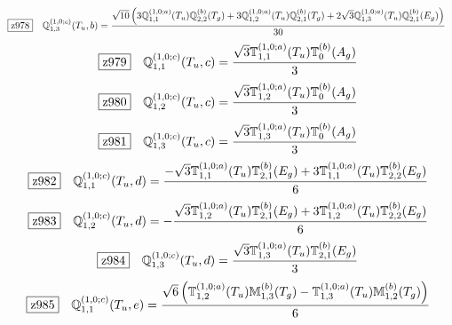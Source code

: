 \documentclass[fleqn,10pt,landscape]{jsarticle}
\begin{document}
\begin{dmath*}
\hspace*{3mm}\fbox{z978}\quad \mathbb{Q}_{1,3}^{(1,0;c)}(T_{u},b)=\frac{\sqrt{10} \left(3 \mathbb{Q}_{1,1}^{(1,0;a)}(T_{u}) \mathbb{Q}_{2,2}^{(b)}(T_{g}) + 3 \mathbb{Q}_{1,2}^{(1,0;a)}(T_{u}) \mathbb{Q}_{2,1}^{(b)}(T_{g}) + 2 \sqrt{3} \mathbb{Q}_{1,3}^{(1,0;a)}(T_{u}) \mathbb{Q}_{2,1}^{(b)}(E_{g})\right)}{30}
\end{dmath*}
\begin{dmath*}
\hspace*{3mm}\fbox{z979}\quad \mathbb{Q}_{1,1}^{(1,0;c)}(T_{u},c)=\frac{\sqrt{3} \mathbb{T}_{1,1}^{(1,0;a)}(T_{u}) \mathbb{T}_{0}^{(b)}(A_{g})}{3}
\end{dmath*}
\begin{dmath*}
\hspace*{3mm}\fbox{z980}\quad \mathbb{Q}_{1,2}^{(1,0;c)}(T_{u},c)=\frac{\sqrt{3} \mathbb{T}_{1,2}^{(1,0;a)}(T_{u}) \mathbb{T}_{0}^{(b)}(A_{g})}{3}
\end{dmath*}
\begin{dmath*}
\hspace*{3mm}\fbox{z981}\quad \mathbb{Q}_{1,3}^{(1,0;c)}(T_{u},c)=\frac{\sqrt{3} \mathbb{T}_{1,3}^{(1,0;a)}(T_{u}) \mathbb{T}_{0}^{(b)}(A_{g})}{3}
\end{dmath*}
\begin{dmath*}
\hspace*{3mm}\fbox{z982}\quad \mathbb{Q}_{1,1}^{(1,0;c)}(T_{u},d)=\frac{- \sqrt{3} \mathbb{T}_{1,1}^{(1,0;a)}(T_{u}) \mathbb{T}_{2,1}^{(b)}(E_{g}) + 3 \mathbb{T}_{1,1}^{(1,0;a)}(T_{u}) \mathbb{T}_{2,2}^{(b)}(E_{g})}{6}
\end{dmath*}
\begin{dmath*}
\hspace*{3mm}\fbox{z983}\quad \mathbb{Q}_{1,2}^{(1,0;c)}(T_{u},d)=- \frac{\sqrt{3} \mathbb{T}_{1,2}^{(1,0;a)}(T_{u}) \mathbb{T}_{2,1}^{(b)}(E_{g}) + 3 \mathbb{T}_{1,2}^{(1,0;a)}(T_{u}) \mathbb{T}_{2,2}^{(b)}(E_{g})}{6}
\end{dmath*}
\begin{dmath*}
\hspace*{3mm}\fbox{z984}\quad \mathbb{Q}_{1,3}^{(1,0;c)}(T_{u},d)=\frac{\sqrt{3} \mathbb{T}_{1,3}^{(1,0;a)}(T_{u}) \mathbb{T}_{2,1}^{(b)}(E_{g})}{3}
\end{dmath*}
\begin{dmath*}
\hspace*{3mm}\fbox{z985}\quad \mathbb{Q}_{1,1}^{(1,0;c)}(T_{u},e)=\frac{\sqrt{6} \left(\mathbb{T}_{1,2}^{(1,0;a)}(T_{u}) \mathbb{M}_{1,3}^{(b)}(T_{g}) - \mathbb{T}_{1,3}^{(1,0;a)}(T_{u}) \mathbb{M}_{1,2}^{(b)}(T_{g})\right)}{6}
\end{dmath*}
\end{document}
